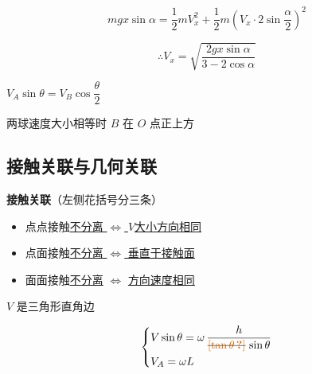 \[
mgx\sin\alpha=\frac12mV_x^{2}+\frac12m\left(V_x\cdot2\sin\frac{\alpha}{2}\right)^{2}
\]

\[
\therefore V_x=\sqrt{\frac{2gx\sin\alpha}{3-2\cos\alpha}}
\]



$V_A\sin\theta=V_B\cos\dfrac{\theta}{2}$

两球速度大小相等时 $B$ 在 $O$ 点正上方%

\subsection{接触关联与几何关联}
\textbf{接触关联}（左侧花括号分三条）
\begin{itemize}
\item 点点接触\quad \underline{不分离 $\Leftrightarrow$ $V$大小方向相同}
\item 点面接触\quad \underline{不分离 $\Leftrightarrow$ 垂直于接触面}%
\item 面面接触\quad \underline{不分离} $\Leftrightarrow$ \underline{方向速度相同}
\end{itemize}

\begin{keybox}[几何关联]%
$V$ 是三角形直角边
\end{keybox}

\noindent {}%

\[
\left\{\begin{aligned}
&V\sin\theta=\omega\,\dfrac{h}{\text{\struck{\unclear{$\tan\theta$}}}\,\sin\theta}\\
&V_A=\omega L
\end{aligned}\right.
\]%

\noindent {}

